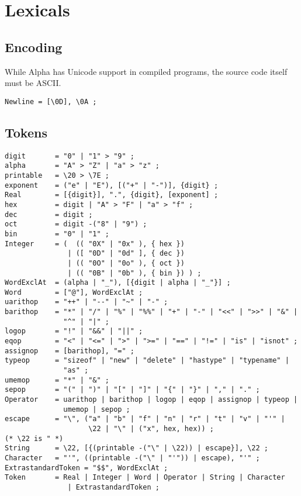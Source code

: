 \documentclass{article}
\begin{document}
\section{Lexicals}
\label{sec:lexicals}

\subsection{Encoding}
\label{sec:encoding}
While Alpha has Unicode support in compiled programs, the source code itself
must be ASCII.
\begin{verbatim}
Newline = [\0D], \0A ;
\end{verbatim}

\subsection{Tokens}
\label{sub:lexicals:tokens}
\begin{verbatim}
digit       = "0" | "1" > "9" ;
alpha       = "A" > "Z" | "a" > "z" ;
printable   = \20 > \7E ;
exponent    = ("e" | "E"), [("+" | "-")], {digit} ;
Real        = [{digit}], ".", {digit}, [exponent] ;
hex         = digit | "A" > "F" | "a" > "f" ;
dec         = digit ;
oct         = digit -("8" | "9") ;
bin         = "0" | "1" ;
Integer     = (  (( "0X" | "0x" ), { hex })
               | ([ "0D" | "0d" ], { dec })
               | (( "0O" | "0o" ), { oct })
               | (( "0B" | "0b" ), { bin }) ) ;
WordExclAt  = (alpha | "_"), [{digit | alpha | "_"}] ;
Word        = ["@"], WordExclAt ;
uarithop    = "++" | "--" | "~" | "-" ;
barithop    = "*" | "/" | "%" | "%%" | "+" | "-" | "<<" | ">>" | "&" |
              "^" | "|" ;
logop       = "!" | "&&" | "||" ;
eqop        = "<" | "<=" | ">" | ">=" | "==" | "!=" | "is" | "isnot" ;
assignop    = [barithop], "=" ;
typeop      = "sizeof" | "new" | "delete" | "hastype" | "typename" |
              "as" ;
umemop      = "*" | "&" ;
sepop       = "(" | ")" | "[" | "]" | "{" | "}" | "," | "." ;
Operator    = uarithop | barithop | logop | eqop | assignop | typeop |
              umemop | sepop ;
escape      = "\", ("a" | "b" | "f" | "n" | "r" | "t" | "v" | "'" |
                    \22 | "\" | ("x", hex, hex)) ;
(* \22 is " *)
String      = \22, [{(printable -("\" | \22)) | escape}], \22 ;
Character   = "'", ((printable -("\" | "'")) | escape), "'" ;
ExtrastandardToken = "$$", WordExclAt ;
Token       = Real | Integer | Word | Operator | String | Character
               | ExtrastandardToken ;
\end{verbatim}
\end{document}
